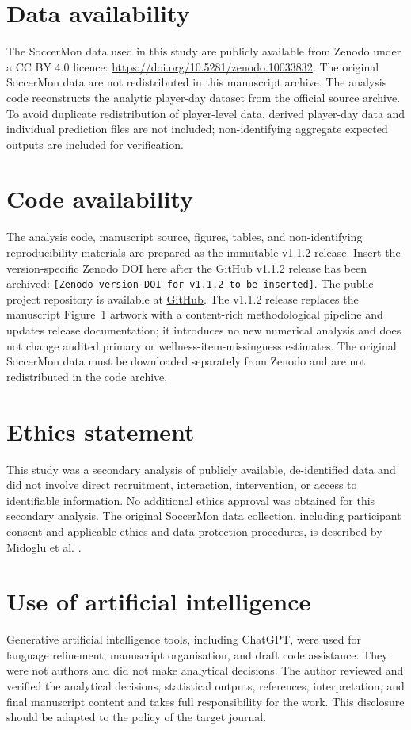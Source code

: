 \section*{Data availability}
The SoccerMon data used in this study are publicly available from Zenodo under a CC BY 4.0 licence: \url{https://doi.org/10.5281/zenodo.10033832}. The original SoccerMon data are not redistributed in this manuscript archive. The analysis code reconstructs the analytic player-day dataset from the official source archive. To avoid duplicate redistribution of player-level data, derived player-day data and individual prediction files are not included; non-identifying aggregate expected outputs are included for verification.

\section*{Code availability}
The analysis code, manuscript source, figures, tables, and non-identifying reproducibility materials are prepared as the immutable v1.1.2 release. Insert the version-specific Zenodo DOI here after the GitHub v1.1.2 release has been archived: \texttt{[Zenodo version DOI for v1.1.2 to be inserted]}. The public project repository is available at \href{https://github.com/chy010321/next-day-readiness-womens-football}{GitHub}. The v1.1.2 release replaces the manuscript Figure~1 artwork with a content-rich methodological pipeline and updates release documentation; it introduces no new numerical analysis and does not change audited primary or wellness-item-missingness estimates. The original SoccerMon data must be downloaded separately from Zenodo and are not redistributed in the code archive.

\section*{Ethics statement}
This study was a secondary analysis of publicly available, de-identified data and did not involve direct recruitment, interaction, intervention, or access to identifiable information. No additional ethics approval was obtained for this secondary analysis. The original SoccerMon data collection, including participant consent and applicable ethics and data-protection procedures, is described by Midoglu et al. \citep{Midoglu2024}.

\section*{Use of artificial intelligence}
Generative artificial intelligence tools, including ChatGPT, were used for language refinement, manuscript organisation, and draft code assistance. They were not authors and did not make analytical decisions. The author reviewed and verified the analytical decisions, statistical outputs, references, interpretation, and final manuscript content and takes full responsibility for the work. This disclosure should be adapted to the policy of the target journal.

